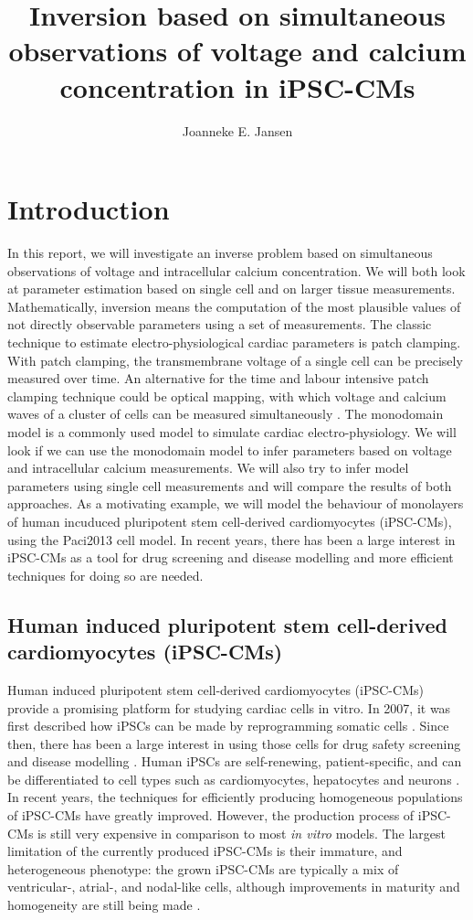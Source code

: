 \documentclass[12pt,a4paper]{article}
\title{Inversion based on simultaneous observations of voltage and calcium concentration in iPSC-CMs}
\author{Joanneke E. Jansen}
\begin{document}
%
\maketitle
\thispagestyle{empty}
\newpage
\tableofcontents
\newpage
%
\section{Introduction} \label{Introduction}
In this report, we will investigate an inverse problem based on simultaneous observations of voltage and intracellular calcium concentration. We will both look at parameter estimation based on single cell and on larger tissue measurements. Mathematically, inversion means the computation of the most plausible values of not directly observable parameters using a set of measurements. The classic technique to estimate electro-physiological cardiac parameters is patch clamping. With patch clamping, the transmembrane voltage of a single cell can be precisely measured over time. An alternative for the time and labour intensive patch clamping technique could be optical mapping, with which voltage and calcium waves of a cluster of cells can be measured simultaneously \cite{Lee2012}. The monodomain model is a commonly used model to simulate cardiac electro-physiology. We will look if we can use the monodomain model to infer parameters based on voltage and intracellular calcium measurements. We will also try to infer model parameters using single cell measurements and will compare the results of both approaches. As a motivating example, we will model the behaviour of monolayers of human incuduced pluripotent stem cell-derived cardiomyocytes (iPSC-CMs), using the Paci2013 cell model. In recent years, there has been a large interest in iPSC-CMs as a tool for drug screening and disease modelling and more efficient techniques for doing so are needed.
%
\subsection{Human induced pluripotent stem cell-derived cardiomyocytes (iPSC-CMs)}
Human induced pluripotent stem cell-derived cardiomyocytes (iPSC-CMs) provide a promising platform for studying cardiac cells in vitro. In 2007, it was first described how iPSCs can be made by reprogramming somatic cells \cite{Takahashi2007}. Since then, there has been a large interest in using those cells for drug safety screening and disease modelling \cite{Sallam2016}. Human iPSCs are self-renewing, patient-specific, and can be differentiated to cell types such as cardiomyocytes, hepatocytes and neurons \cite{Rajamohan2013}. In recent years, the techniques for efficiently producing homogeneous populations of iPSC-CMs  have greatly improved. However, the production process of iPSC-CMs is still very expensive in comparison to most \textit{in vitro} models. The largest limitation of the currently produced iPSC-CMs is their immature, and heterogeneous phenotype: the grown iPSC-CMs are typically a mix of ventricular-, atrial-, and nodal-like cells, although improvements in maturity and homogeneity are still being made \cite{Denning2016}. 
%
\end{document}
